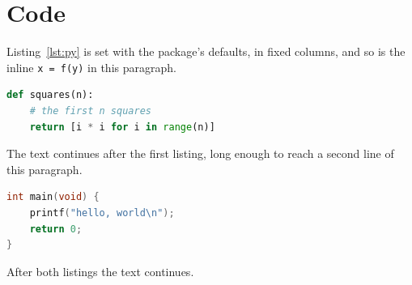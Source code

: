 \documentclass[11pt,a4paper]{article}
\begin{document}
\section{Code}
Listing~\ref{lst:py} is set with the package's defaults, in fixed columns,
and so is the inline \lstinline|x = f(y)| in this paragraph.
\begin{lstlisting}[language=Python, caption={Squares in Python.}, label=lst:py]
def squares(n):
    # the first n squares
    return [i * i for i in range(n)]
\end{lstlisting}
The text continues after the first listing, long enough to reach a second
line of this paragraph.

\begin{lstlisting}[language=C, style=framed]
int main(void) {
    printf("hello, world\n");
    return 0;
}
\end{lstlisting}

After both listings the text continues.
\end{document}
